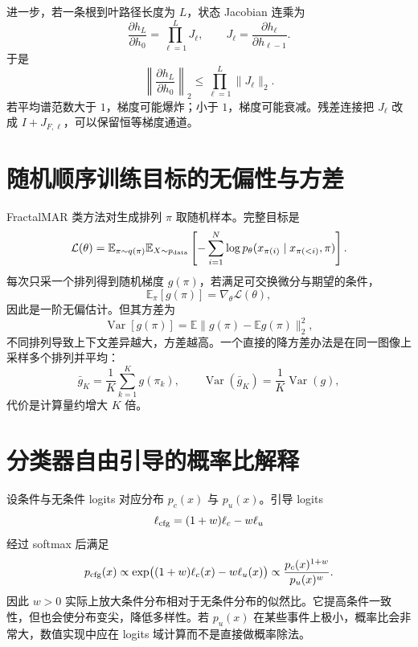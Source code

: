 \documentclass[UTF8,12pt,a4paper,fontset=none]{ctexart}
\numberwithin{equation}{section}
\newcommand{\E}{\mathbb{E}}
\newcommand{\Loss}{\mathcal{L}}
\begin{document}
进一步，若一条根到叶路径长度为 $L$，状态 Jacobian 连乘为
\begin{equation}
 \frac{\partial h_L}{\partial h_0}
 =\prod_{\ell=1}^{L}J_\ell,
 \qquad J_\ell=\frac{\partial h_\ell}{\partial h_{\ell-1}}.
\end{equation}
于是
\begin{equation}
 \left\|\frac{\partial h_L}{\partial h_0}\right\|_2
 \le\prod_{\ell=1}^{L}\|J_\ell\|_2.
\end{equation}
若平均谱范数大于 $1$，梯度可能爆炸；小于 $1$，梯度可能衰减。残差连接把 $J_\ell$ 改成 $I+J_{F,\ell}$，可以保留恒等梯度通道。

\section{随机顺序训练目标的无偏性与方差}
FractalMAR 类方法对生成排列 $\pi$ 取随机样本。完整目标是
\begin{equation}
 \Loss(\theta)=\E_{\pi\sim q(\pi)}
 \E_{X\sim p_{\rm data}}
 \left[-\sum_{i=1}^{N}\log p_\theta(x_{\pi(i)}\mid x_{\pi(<i)},\pi)\right].
\end{equation}
每次只采一个排列得到随机梯度 $g(\pi)$，若满足可交换微分与期望的条件，
\begin{equation}
 \E_\pi[g(\pi)]=\nabla_\theta\Loss(\theta),
\end{equation}
因此是一阶无偏估计。但其方差为
\begin{equation}
 \operatorname{Var}[g(\pi)]
 =\E\|g(\pi)-\E g(\pi)\|_2^2,
\end{equation}
不同排列导致上下文差异越大，方差越高。一个直接的降方差办法是在同一图像上采样多个排列并平均：
\begin{equation}
 \bar g_K=\frac1K\sum_{k=1}^{K}g(\pi_k),\qquad
 \operatorname{Var}(\bar g_K)=\frac1K\operatorname{Var}(g),
\end{equation}
代价是计算量约增大 $K$ 倍。

\section{分类器自由引导的概率比解释}
设条件与无条件 logits 对应分布 $p_c(x)$ 与 $p_u(x)$。引导 logits
\begin{equation}
 \ell_{\rm cfg}=(1+w)\ell_c-w\ell_u
\end{equation}
经过 softmax 后满足
\begin{equation}
 p_{\rm cfg}(x)
 \propto \exp\bigl((1+w)\ell_c(x)-w\ell_u(x)\bigr)
 \propto \frac{p_c(x)^{1+w}}{p_u(x)^w}.
\end{equation}
因此 $w>0$ 实际上放大条件分布相对于无条件分布的似然比。它提高条件一致性，但也会使分布变尖，降低多样性。若 $p_u(x)$ 在某些事件上极小，概率比会非常大，数值实现中应在 logits 域计算而不是直接做概率除法。
\end{document}
